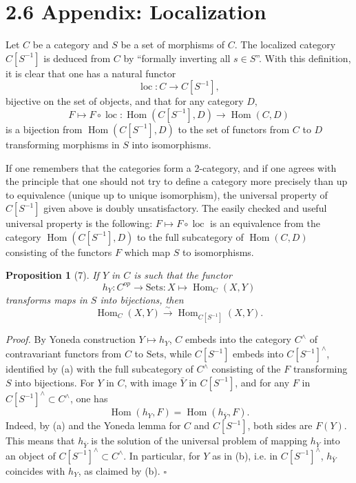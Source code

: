 \documentclass[11pt]{article}
\newcommand{\Hom}{\operatorname{Hom}}
\theoremstyle{deligne}
\newtheorem*{proposition*}{Proposition}
\newenvironment{proofdel}{\noindent\textit{Proof.}}{\hfill$\square$}
\begin{document}
\section*{2.6 Appendix: Localization}

Let \(C\) be a category and \(S\) be a set of morphisms of \(C\). The localized category \(C[S^{-1}]\) is deduced from \(C\) by ``formally inverting all \(s\in S\)''. With this definition, it is clear that one has a natural functor
\[
\operatorname{loc}:C\longrightarrow C[S^{-1}],
\]
bijective on the set of objects, and that for any category \(D\),
\[
F\longmapsto F\circ\operatorname{loc}:\Hom(C[S^{-1}],D)\longrightarrow\Hom(C,D)
\]
is a bijection from \(\Hom(C[S^{-1}],D)\) to the set of functors from \(C\) to \(D\) transforming morphisms in \(S\) into isomorphisms.

If one remembers that the categories form a 2-category, and if one agrees with the principle that one should not try to define a category more precisely than up to equivalence (unique up to unique isomorphism), the universal property of \(C[S^{-1}]\) given above is doubly unsatisfactory. The easily checked and useful universal property is the following: \(F\mapsto F\circ\operatorname{loc}\) is an equivalence from the category \(\Hom(C[S^{-1}],D)\) to the full subcategory of \(\Hom(C,D)\) consisting of the functors \(F\) which map \(S\) to isomorphisms.

\begin{proposition*}[7]
If \(Y\) in \(C\) is such that the functor
\[
h_Y:C^{op}\longrightarrow \mathrm{Sets}:X\longmapsto\Hom_C(X,Y)
\]
transforms maps in \(S\) into bijections, then
\[
\Hom_C(X,Y)\overset{\sim}{\longrightarrow}\Hom_{C[S^{-1}]}(X,Y).
\]
\end{proposition*}

\begin{proofdel}
By Yoneda construction \(Y\mapsto h_Y\), \(C\) embeds into the category \(C^\wedge\) of contravariant functors from \(C\) to \(\mathrm{Sets}\), while \(C[S^{-1}]\) embeds into \(C[S^{-1}]^\wedge\), identified by (a) with the full subcategory of \(C^\wedge\) consisting of the \(F\) transforming \(S\) into bijections. For \(Y\) in \(C\), with image \(\bar Y\) in \(C[S^{-1}]\), and for any \(F\) in \(C[S^{-1}]^\wedge\subset C^\wedge\), one has
\[
\Hom(h_Y,F)=\Hom(h_{\bar Y},F).
\]
Indeed, by (a) and the Yoneda lemma for \(C\) and \(C[S^{-1}]\), both sides are \(F(Y)\). This means that \(h_{\bar Y}\) is the solution of the universal problem of mapping \(h_Y\) into an object of \(C[S^{-1}]^\wedge\subset C^\wedge\). In particular, for \(Y\) as in (b), i.e. in \(C[S^{-1}]^\wedge\), \(h_{\bar Y}\) coincides with \(h_Y\), as claimed by (b).
\end{proofdel}
\end{document}
